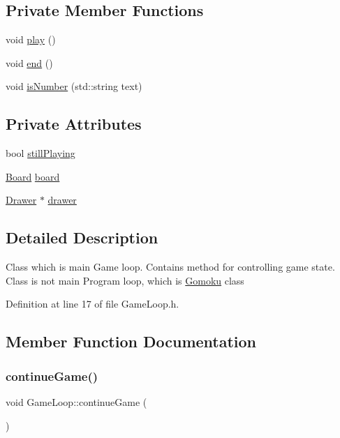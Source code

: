\subsection*{Private Member Functions}
\begin{DoxyCompactItemize}
\item 
void \hyperlink{classGameLoop_a7e143e66d9a047a15d20c20da85f23d0}{play} ()
\item 
void \hyperlink{classGameLoop_a30733a30b29bc93c3009b62bde59ddde}{end} ()
\item 
void \hyperlink{classGameLoop_aef095ed6895919ae55e260b0149ff29a}{is\+Number} (std\+::string text)
\end{DoxyCompactItemize}
\subsection*{Private Attributes}
\begin{DoxyCompactItemize}
\item 
bool \hyperlink{classGameLoop_a74bff510eaf3cab91599f164dfa903cf}{still\+Playing}
\item 
\hyperlink{classBoard}{Board} \hyperlink{classGameLoop_a73ffb8954f2f2fd298e2bfe22be73ce6}{board}
\item 
\hyperlink{classDrawer}{Drawer} $\ast$ \hyperlink{classGameLoop_a9f25ffc0e91f10c6030ca6b05032f71f}{drawer}
\end{DoxyCompactItemize}


\subsection{Detailed Description}
Class which is main Game loop. Contains method for controlling game state. Class is not main Program loop, which is \hyperlink{classGomoku}{Gomoku} class 

Definition at line 17 of file Game\+Loop.\+h.



\subsection{Member Function Documentation}
\mbox{\label{classGameLoop_adc88e75cb8106655d88296cc082767bc}} 
\subsubsection{\texorpdfstring{continue\+Game()}{continueGame()}}
{\footnotesize\ttfamily void Game\+Loop\+::continue\+Game (\begin{DoxyParamCaption}{ }\end{DoxyParamCaption})}

